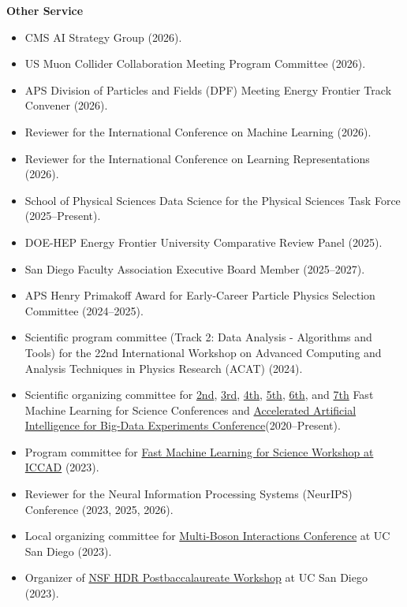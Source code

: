 \documentclass[11pt]{res}
\begin{document}
\begin{resume}
  \textbf{Other Service}
  \begin{itemize}
    \itemsep-0.3em
    \item CMS AI Strategy Group (2026).
    \item US Muon Collider Collaboration Meeting Program Committee (2026).
    \item APS Division of Particles and Fields (DPF) Meeting Energy Frontier Track Convener (2026).
    \item Reviewer for the International Conference on Machine Learning (2026).
    \item Reviewer for the International Conference on Learning Representations (2026).
    \item School of Physical Sciences Data Science for the Physical Sciences Task Force (2025--Present).
    \item DOE-HEP Energy Frontier University Comparative Review Panel (2025).
    \item San Diego Faculty Association Executive Board Member (2025--2027).
    \item APS Henry Primakoff Award for Early-Career Particle Physics Selection Committee (2024--2025).
    \item Scientific program committee (Track 2: Data Analysis - Algorithms and Tools) for the 22nd International Workshop on Advanced Computing and Analysis Techniques in Physics Research (ACAT) (2024).
    \item Scientific organizing committee for \href{https://indico.cern.ch/e/fml2020}{2nd}, \href{https://indico.cern.ch/e/fml2022}{3rd}, \href{https://indico.cern.ch/e/fastml2023}{4th}, \href{https://indico.cern.ch/e/fastml2024}{5th}, \href{https://indi.to/fastml25}{6th}, and \href{https://indi.to/fastml26}{7th} Fast Machine Learning for Science Conferences and \href{http://www.ncsa.illinois.edu/Conferences/AcceleratedAINCSA/}{Accelerated Artificial Intelligence for Big-Data Experiments Conference}({2020--Present}).
    \item Program committee for \href{https://fastmachinelearning.org/iccad2023/}{Fast Machine Learning for Science Workshop at ICCAD} (2023).
    \item Reviewer for the Neural Information Processing Systems (NeurIPS) Conference (2023, 2025, 2026).
    \item Local organizing committee for \href{https://indico.cern.ch/e/mbi2023}{Multi-Boson Interactions Conference} at UC San Diego (2023).
    \item Organizer of \href{https://indico.cern.ch/e/hdrpostbac2023}{NSF HDR Postbaccalaureate Workshop} at UC San Diego (2023).

\end{itemize}
\end{resume}
\end{document}
